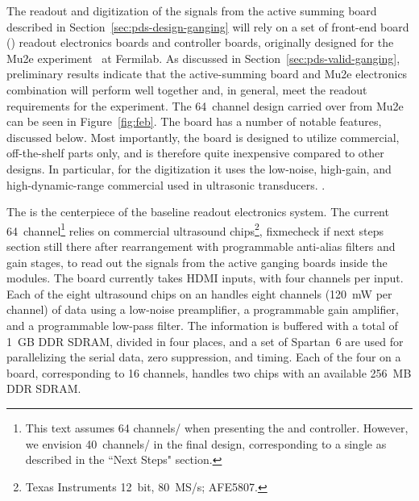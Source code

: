 The readout and digitization of the signals from the active summing board described in Section~\ref{sec:pds-design-ganging} will rely on a set of front-end board () readout electronics boards and controller boards, originally designed for the Mu2e experiment~\cite{bib:mu2e_tdr} %
at Fermilab. As discussed in Section~\ref{sec:pds-valid-ganging}, preliminary results indicate that the active-summing board and Mu2e electronics  combination will perform well together and, in general, meet the readout requirements for the experiment. The 64~channel  design carried over from Mu2e can be seen in Figure~\ref{fig:feb}. The board has a number of notable features, discussed below. Most importantly, %
the board is designed to utilize commercial, off-the-shelf parts only, and is therefore quite inexpensive compared to other designs. In particular, for the digitization it uses the low-noise, high-gain, and high-dynamic-range commercial  used in ultrasonic transducers. %
.

The  is the centerpiece of the baseline readout electronics system. %
The current 64~channel\footnote{This text assumes 64 channels/ when presenting the  and controller. However, we envision 40~channels/ in the final design, corresponding to a single  as described in the ``Next Steps" section.}  relies on commercial ultrasound chips\footnote{Texas Instruments\texttrademark{} 12~bit, 80~MS/s; AFE5807.},
fixme{check if next steps section still there after rearrangement}  with programmable anti-alias filters and gain stages, to read out the  signals from the active ganging boards inside the  modules. The board currently takes HDMI inputs, with four channels per input.  Each of the eight ultrasound chips on an  handles eight channels (\SI{120}{mW} per channel) of data using a low-noise preamplifier, a programmable gain amplifier, and a programmable low-pass filter. The information is buffered with a total of \SI{1}{GB} DDR SDRAM, divided in four places, and a set of Spartan~6\texttrademark {} are used for parallelizing the serial  data, zero suppression, and timing. Each of the four  on a board, corresponding to 16 channels, handles two  chips with an available \SI{256}{MB} DDR SDRAM. 

